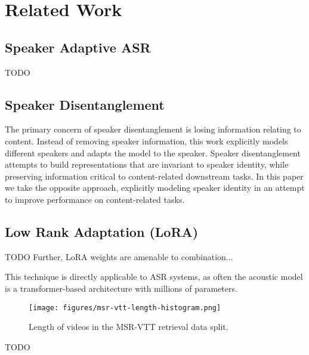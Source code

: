 \section{Related Work}

\subsection{Speaker Adaptive ASR}

TODO

\subsection{Speaker Disentanglement}

The primary concern of speaker disentanglement is losing information relating to content.
Instead of removing speaker information, this work explicitly models different speakers and adapts the model to the speaker.
Speaker disentanglement attempts to build representations that are invariant to speaker identity, while preserving information critical to content-related downstream tasks. 
In this paper we take the opposite approach, explicitly modeling speaker identity in an attempt to improve performance on content-related tasks.


\subsection{Low Rank Adaptation (LoRA)}

TODO
Further, LoRA weights are amenable to combination...

This technique is directly applicable to ASR systems, as often the acoustic model is a transformer-based architecture with millions of parameters.


\begin{figure}[h]
      \centering
      \texttt{[image: figures/msr-vtt-length-histogram.png]}
      \caption{Length of videos in the MSR-VTT retrieval data split.}
      \label{fig:length_histogram}
\end{figure}

TODO
